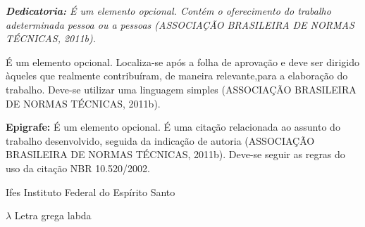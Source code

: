 \documentclass[
  12pt,				    %
  openright,			%
  oneside,			  %
  a4paper,			  %
  chapter=TITLE,  %
  section=TITLE,  %
  english,			  %
  french,				  %
  spanish,			  %
  brazil				  %
]{iftex}
\begin{document}
  \begin{dedicatoria}
    \vspace*{\fill}
    \noindent

    \begin{flushright}
      \textit{
        \textbf{Dedicatoria:} É um elemento opcional. Contém o oferecimento do trabalho adeterminada pessoa ou a pessoas (ASSOCIAÇÃO BRASILEIRA DE NORMAS TÉCNICAS, 2011b).} 
    \end{flushright}

    \vspace*{2.0cm}
	\end{dedicatoria}
    
  \begin{agradecimentos}
    É um elemento opcional. Localiza-se após a folha de aprovação e deve ser dirigido àqueles que realmente contribuíram, de maneira relevante,para a elaboração do trabalho. Deve-se utilizar uma linguagem simples (ASSOCIAÇÃO BRASILEIRA DE NORMAS TÉCNICAS, 2011b).
  \end{agradecimentos}
  
  \begin{epigrafe}
    \vspace*{\fill}
    \begin{center}
      \textbf{Epigrafe:} É um elemento opcional. É uma citação relacionada ao assunto do trabalho desenvolvido, seguida da indicação de autoria (ASSOCIAÇÃO BRASILEIRA DE NORMAS TÉCNICAS, 2011b).   Deve-se seguir as regras do uso da citação NBR 10.520/2002. 
    \end{center}
  \end{epigrafe}
  
  

  \listoffigures*
  \cleardoublepage

  \listoftables*
  \cleardoublepage

  \listofquadros*
  \cleardoublepage

  \begin{siglas}
    \item[Ifes] Instituto Federal do Espírito Santo
  \end{siglas}

  \begin{simbolos}
    \item[$\lambda$] Letra grega labda
  \end{simbolos}
\end{document}
